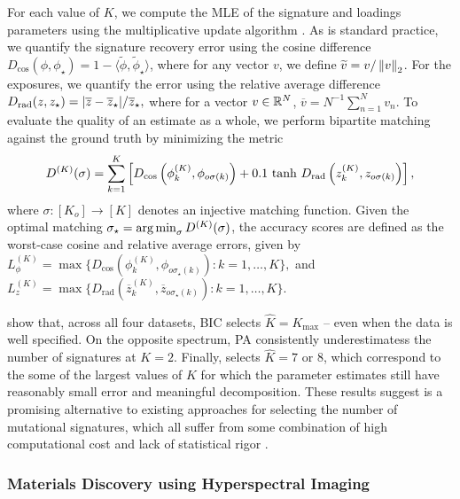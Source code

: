 For each value of $K$, we compute the MLE of the signature and loadings parameters using the multiplicative update algorithm %
\citep{Lee-Seung_multdiv_2000}.
As is standard practice, we quantify the signature recovery error using the cosine difference $
	D_{\mathrm{cos}}({\phi},{\phi}_{\star})=1-\langle {\widetilde\phi},{\widetilde\phi}_{\star} \rangle$, where for any vector ${v}$, we define ${\widetilde v} = {v} / \left\|{{v}}\right\|_{2}$.
For the exposures, we quantify the error using the relative average difference
$
	D_{\mathrm{rad}}({z}, {z}_{\star})= {\left\lvert \overline{z}-\overline{z}_{\star}\right\rvert}/{\overline{z}_{\star}},
$
where for a vector ${v} \in \mathbb{R}^N$, $\overline{v} = N^{-1}\sum_{n=1}^N v_n$.
To evaluate the quality of an estimate as a whole, we perform bipartite matching against the ground truth by minimizing the metric
\[
	D^{(K)}(\sigma)=\sum^{K}_{k=1}\left[D_{\mathrm{cos}}\left({\phi}^{(K)}_{k},{\phi}_{o\sigma(k)}\right)
		+0.1\, \tanh\, D_{\mathrm{rad}}\left({z}^{(K)}_{k},{z}_{o\sigma(k)}\right)\right],
\]
where $\sigma \colon [K_o] \to [K]$ denotes an injective matching function.
Given the optimal matching $\sigma_{\star} = \argmin_\sigma D^{(K)}(\sigma)$, the accuracy scores are defined
as the worst-case cosine and relative average errors, given by
$
	L^{(K)}_{{\phi}} = \max\{D_{\mathrm{cos}}({\phi}^{(K)}_{k},{\phi}_{o\sigma_{\star}(k)}) : k=1,\dots,K \},
$
and
$
	L^{(K)}_{z} = \max\{D_{\mathrm{rad}}(\overline{z}^{(K)}_{k},\overline{z}_{o\sigma_{\star}(k)}) :  k=1,\dots,K\}.
$

 show that, across all four datasets,
BIC selects $\widehat{K} = K_{\max}$ -- even when the data is well specified.
On the opposite spectrum, PA consistently underestimatess the number of signatures at $K = 2$. Finally, \methodname selects $\widehat K = 7$ or $8$, which correspond to the some of the largest values of $K$ for which the parameter estimates still have reasonably small error and meaningful decomposition.
These results suggest \methodname is a promising alternative to existing approaches for selecting the number of mutational signatures, which all suffer from some combination of high computational cost and lack of statistical rigor \citep{Xue:2024,pcawg2020}.

\subsubsection{Materials Discovery using Hyperspectral Imaging} \label{sec:hyperspectral}

